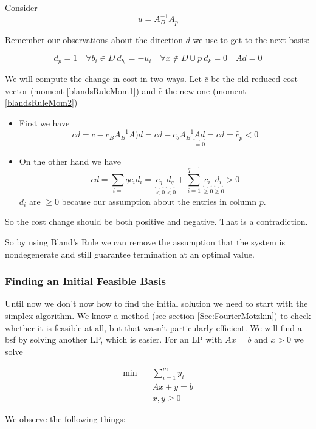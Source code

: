 \begin{pr}
Consider 
\[u=A_D^{-1}A_p\]

Remember our observations about the direction $d$ we use to get to the next basis:

\[d_p =1 \quad \forall b_i \in D\ d_{b_i} = -u_i \quad \forall x\not \in D\cup p\ d_k=0\quad Ad=0\]

We will compute the  change in cost in two ways. Let $\bar c$ be the old reduced cost vector (moment \ref{blandsRuleMom1}) and $\hat c$ the new one (moment \ref{blandsRuleMom2})

\begin{itemize}
\item First we have 
\[\bar cd = c-c_BA_B^{-1}A)d=cd-c_bA_B^{-1}\underbrace{Ad}_{=0} = cd = \hat c_p<0\]
\item On the other hand we have
\[\bar c d = \sum_{i=}q \bar c_id_i = \underbrace{\bar c_q}_{<0}\underbrace{d_q}_{<0} + \sum _{i=1}^{q-1} \underbrace{\bar c_i}_{\geq 0}\underbrace{d_i}_{\geq 0} >0\]
$d_i$ are $\geq 0$ because our assumption about the entries in column $p$. %
\end{itemize}

So the cost change should be both positive and negative. That is a contradiction.
\end{pr}

So by using Bland's Rule we can remove the assumption that the system is nondegenerate and still guarantee termination at an optimal value.

\subsubsection*{Finding an Initial Feasible Basis}

Until now we don't now how to find the initial solution we need to start with the simplex algorithm. We know a method (see section \ref{Sec:FourierMotzkin}) to check whether it is feasible at all, but that wasn't particularly efficient. We will find a bsf by solving another LP, which is easier. For an LP with $Ax=b$ and $x>0$ we solve

\begin{align*}
\min \quad & \sum_{i=1}^m y_i\\
&Ax+y=b\\
&x,y\geq 0
\end{align*}

We observe the following things:

